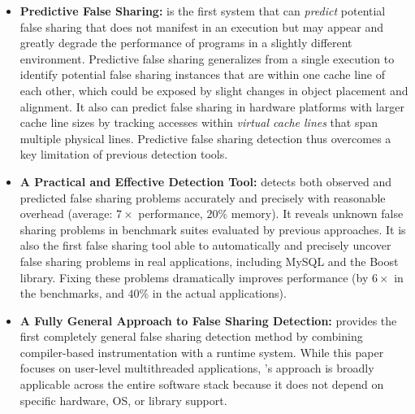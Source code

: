 \begin{itemize}


\item
\textbf{Predictive False Sharing:} \Predator{} is the first system that can \emph{predict} potential false sharing that does
not manifest in an execution but may appear and greatly degrade the
performance of programs in a slightly different
environment. Predictive false sharing generalizes from a single
execution to identify potential false sharing instances that are
within one cache line of each other, which could be exposed by slight
changes in object placement and alignment. It also can predict false sharing
in hardware platforms with larger cache line sizes by tracking
accesses within \emph{virtual cache lines} that span multiple physical
lines. Predictive false sharing detection thus overcomes a key
limitation of previous detection tools.



\item
\textbf{A Practical and Effective Detection Tool:} \Predator{} detects both observed and predicted false sharing 
problems accurately and precisely with reasonable overhead (average:
$7\times$ performance, $20\%$ memory).  It reveals unknown false
sharing problems in benchmark suites evaluated by previous approaches. It
is also the first false sharing tool able to automatically and precisely uncover
false sharing problems in real applications, including 
MySQL and the Boost library. Fixing these problems 
dramatically improves performance (by $6\times$ in the benchmarks, and $40\%$ in the actual applications).


\item
\textbf{A Fully General Approach to False Sharing Detection:} \Predator{} provides the first completely general false sharing detection method by
combining compiler-based instrumentation with a runtime system. While this
paper focuses on user-level multithreaded applications, \Predator{}'s
approach is broadly applicable across the entire software stack
because it does not depend on specific hardware, OS, or library
support.


\end{itemize}
